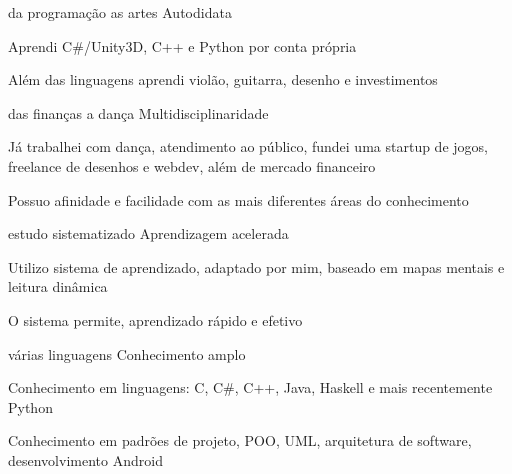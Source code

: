 

\begin{cventries}

	\cventry
	    {da programação as artes} %
	    {Autodidata} %
	    {} %
	    {} %
	    {
	      \begin{cvitems} %
	        \item {Aprendi C\#/Unity3D, C++ e Python por conta própria}
	        \item {Além das linguagens aprendi violão, guitarra, desenho e investimentos}
	      \end{cvitems}
	    }


	\cventry
		{das finanças a dança} %
		{Multidisciplinaridade} %
		{} %
		{} %
		{
			\begin{cvitems} %
				\item {Já trabalhei com dança, atendimento ao público, fundei uma startup de jogos, freelance de desenhos e webdev, além de mercado financeiro}
				\item {Possuo afinidade e facilidade com as mais diferentes áreas do conhecimento}
			\end{cvitems}
		}


	\cventry
		{estudo sistematizado} %
		{Aprendizagem acelerada} %
		{} %
		{} %
		{
			\begin{cvitems} %
				\item {Utilizo sistema de aprendizado, adaptado por mim, baseado em mapas mentais e leitura dinâmica}
				\item {O sistema permite, aprendizado rápido e efetivo}
			\end{cvitems}
		}


	\cventry
		{várias linguagens} %
		{Conhecimento amplo} %
		{} %
		{} %
		{
			\begin{cvitems} %
				\item {Conhecimento em linguagens: C, C\#, C++, Java, Haskell e mais recentemente Python}
				\item {Conhecimento em padrões de projeto, POO, UML, arquitetura de software, desenvolvimento Android}
			\end{cvitems}
		}



\end{cventries}
